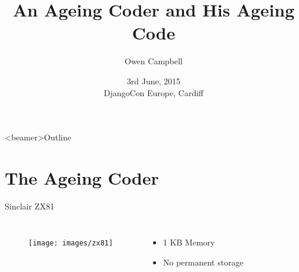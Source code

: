 \documentclass{beamer}
\title{An Ageing Coder and His Ageing Code}
\author{Owen Campbell}
\date[DjangoCon Europe 2015]{3rd June, 2015\\DjangoCon Europe, Cardiff}
\begin{document}
\begin{frame}
  \titlepage{}
\end{frame}

{
  \begin{frame}<beamer>{Outline}
    \tableofcontents
  \end{frame}
}

\section{The Ageing Coder}

  \begin{frame}{Sinclair ZX81}
    \begin{columns}
        \begin{figure}
          \texttt{[image: images/zx81]}
        \end{figure}
        \begin{itemize}
          \item 1 KB Memory
          \item No permanent storage
        \end{itemize}
    \end{columns}
  \end{frame}
\end{document}
